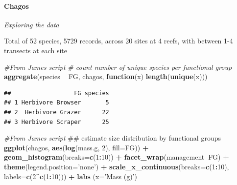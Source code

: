\documentclass[]{article}
\newenvironment{Shaded}{\begin{snugshade}}{\end{snugshade}}
\newcommand{\KeywordTok}[1]{\textcolor[rgb]{0.13,0.29,0.53}{\textbf{#1}}}
\newcommand{\DataTypeTok}[1]{\textcolor[rgb]{0.13,0.29,0.53}{#1}}
\newcommand{\DecValTok}[1]{\textcolor[rgb]{0.00,0.00,0.81}{#1}}
\newcommand{\StringTok}[1]{\textcolor[rgb]{0.31,0.60,0.02}{#1}}
\newcommand{\CommentTok}[1]{\textcolor[rgb]{0.56,0.35,0.01}{\textit{#1}}}
\newcommand{\ControlFlowTok}[1]{\textcolor[rgb]{0.13,0.29,0.53}{\textbf{#1}}}
\newcommand{\OperatorTok}[1]{\textcolor[rgb]{0.81,0.36,0.00}{\textbf{#1}}}
\newcommand{\NormalTok}[1]{#1}
\let\oldparagraph\paragraph
\renewcommand{\paragraph}[1]{\oldparagraph{#1}\mbox{}}
\begin{document}
\paragraph{Chagos}\label{chagos}

\emph{Exploring the data}

Total of 52 species, 5729 records, across 20 sites at 4 reefs, with
between 1-4 transects at each site

\begin{Shaded}
\begin{Highlighting}[]
\CommentTok{#From James script}
\CommentTok{# count number of unique species per functional group}
\KeywordTok{aggregate}\NormalTok{(species }\OperatorTok{~}\StringTok{ }\NormalTok{FG, chagos, }\ControlFlowTok{function}\NormalTok{(x) }\KeywordTok{length}\NormalTok{(}\KeywordTok{unique}\NormalTok{(x)))}
\end{Highlighting}
\end{Shaded}

\begin{verbatim}
##                  FG species
## 1 Herbivore Browser       5
## 2  Herbivore Grazer      22
## 3 Herbivore Scraper      25
\end{verbatim}

\begin{Shaded}
\begin{Highlighting}[]
\CommentTok{#From James script}
\NormalTok{## estimate size distribution by functional groups}
\KeywordTok{ggplot}\NormalTok{(chagos, }\KeywordTok{aes}\NormalTok{(}\KeywordTok{log}\NormalTok{(mass.g, }\DecValTok{2}\NormalTok{), }\DataTypeTok{fill=}\NormalTok{FG)) }\OperatorTok{+}\StringTok{ }\KeywordTok{geom_histogram}\NormalTok{(}\DataTypeTok{breaks=}\KeywordTok{c}\NormalTok{(}\DecValTok{1}\OperatorTok{:}\DecValTok{10}\NormalTok{)) }\OperatorTok{+}\StringTok{ }\KeywordTok{facet_wrap}\NormalTok{(management}\OperatorTok{~}\NormalTok{FG) }\OperatorTok{+}\StringTok{ }\KeywordTok{theme}\NormalTok{(}\DataTypeTok{legend.position=}\StringTok{'none'}\NormalTok{) }\OperatorTok{+}\StringTok{ }\KeywordTok{scale_x_continuous}\NormalTok{(}\DataTypeTok{breaks=}\KeywordTok{c}\NormalTok{(}\DecValTok{1}\OperatorTok{:}\DecValTok{10}\NormalTok{), }\DataTypeTok{labels=}\KeywordTok{c}\NormalTok{(}\DecValTok{2}\OperatorTok{^}\KeywordTok{c}\NormalTok{(}\DecValTok{1}\OperatorTok{:}\DecValTok{10}\NormalTok{))) }\OperatorTok{+}\StringTok{ }\KeywordTok{labs}\NormalTok{ (}\DataTypeTok{x=}\StringTok{'Mass (g)'}\NormalTok{)}
\end{Highlighting}
\end{Shaded}
\end{document}
